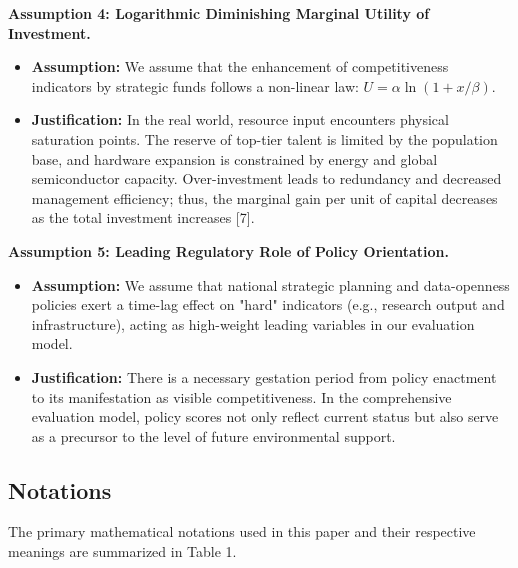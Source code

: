 \documentclass[12pt]{article}
\begin{document}
	\textbf{Assumption 4: Logarithmic Diminishing Marginal Utility of Investment.}
	\begin{itemize}
		\item \textbf{Assumption:} We assume that the enhancement of competitiveness indicators by strategic funds follows a non-linear law: $U = \alpha \ln(1 + x/\beta)$.
		\item \textbf{Justification:} In the real world, resource input encounters physical saturation points. The reserve of top-tier talent is limited by the population base, and hardware expansion is constrained by energy and global semiconductor capacity. Over-investment leads to redundancy and decreased management efficiency; thus, the marginal gain per unit of capital decreases as the total investment increases [7].
	\end{itemize}
	
	\textbf{Assumption 5: Leading Regulatory Role of Policy Orientation.}
	\begin{itemize}
		\item \textbf{Assumption:} We assume that national strategic planning and data-openness policies exert a time-lag effect on "hard" indicators (e.g., research output and infrastructure), acting as high-weight leading variables in our evaluation model.
		\item \textbf{Justification:} There is a necessary gestation period from policy enactment to its manifestation as visible competitiveness. In the comprehensive evaluation model, policy scores not only reflect current status but also serve as a precursor to the level of future environmental support.
	\end{itemize}
	
	\subsection{Notations}
	The primary mathematical notations used in this paper and their respective meanings are summarized in Table 1.
	
\end{document}
